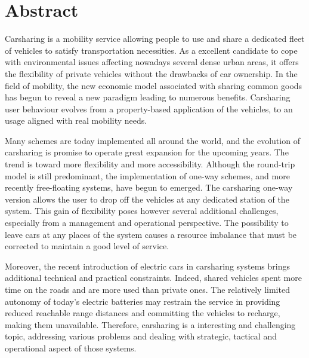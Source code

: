 

\chapter*{Abstract}
Carsharing is a mobility service allowing people to use and share a dedicated fleet of vehicles to satisfy transportation necessities.
As a excellent candidate to cope with environmental issues affecting nowadays several dense urban areas, it offers the flexibility of private vehicles without the drawbacks of car ownership.
In the field of mobility, the new economic model associated with sharing common goods has begun to reveal a new paradigm leading to numerous benefits.
Carsharing user behaviour evolves from a property-based application of the vehicles, to an usage aligned with real mobility needs.

\medskip
Many schemes are today implemented all around the world, and the evolution of carsharing  is promise to operate great expansion for the upcoming years.
The trend is toward more flexibility and more accessibility.
Although the round-trip model is still predominant, the implementation of one-way schemes, and more recently free-floating systems, have begun to emerged.
The carsharing one-way version allows the user to drop off the vehicles at any dedicated station of the system.
This gain of flexibility poses however several additional challenges, especially from a management and operational perspective.
The possibility to leave cars at any places of the system causes a resource imbalance that must be corrected to maintain a good level of service.

\medskip
Moreover, the recent introduction of electric cars in carsharing systems brings additional technical and practical constraints.
Indeed, shared vehicles spent more time on the roads and are more used than private ones.
The relatively limited autonomy of today's electric batteries may restrain the service in providing  reduced reachable range distances and committing the vehicles to recharge, making them unavailable.
Therefore, carsharing is a interesting and challenging topic, addressing various problems and dealing with strategic, tactical and operational aspect of those systems.

